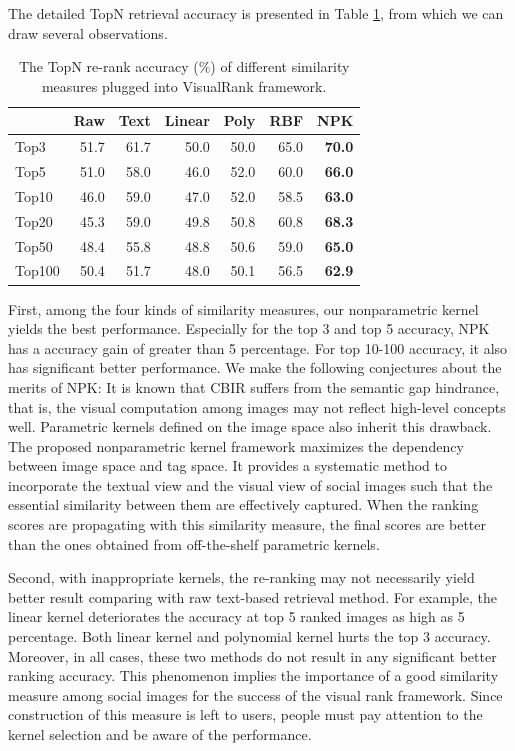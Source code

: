 The detailed TopN retrieval accuracy is presented in Table \ref{table:rerank-result}, from which we can draw several observations.

\begin{table}[!ht]\label{table:rerank-result}
\centering \caption{The TopN re-rank accuracy ($\%$) of different
similarity measures plugged into VisualRank framework. }
\begin{center}
\begin{tabular}{|l|rrrrrr|}
\hline
&Raw &Text &Linear &Poly &RBF &NPK    \\
\hline
\hline
Top3      &51.7 &61.7    &50.0   &50.0   &65.0   &{\bf 70.0} \\
Top5      &51.0 &58.0     &46.0   &52.0   &60.0   &{\bf 66.0}   \\
Top10    &46.0  &59.0     &47.0   &52.0   &58.5   &{\bf 63.0}     \\
Top20    &45.3  &59.0     &49.8   &50.8   &60.8   &{\bf 68.3}       \\
Top50    &48.4  &55.8     &48.8   &50.6   &59.0   &{\bf 65.0}         \\
Top100  &50.4   &51.7     &48.0   &50.1   &56.5   &{\bf 62.9}           \\
\hline
\end{tabular}
\end{center}
\end{table}

First, among the four kinds of similarity measures, our nonparametric
kernel yields the best performance. Especially for the top 3 and top 5
accuracy, NPK has a accuracy gain of greater than 5 percentage. For top
10-100 accuracy, it also has significant better performance. We make the
following conjectures about the merits of NPK: It is known that CBIR
suffers from the semantic gap hindrance, that is, the visual computation
among images may not reflect high-level concepts well. Parametric kernels
defined on the image space also inherit this drawback. The proposed
nonparametric kernel framework maximizes the dependency between
image space and tag space. It provides a systematic method to incorporate
the textual view and the visual view of social images such that the
essential similarity between them are effectively captured. When the
ranking scores are propagating with this similarity measure, the final scores
are better than the ones obtained from off-the-shelf parametric kernels.

Second, with inappropriate kernels, the re-ranking may not necessarily
yield better result comparing with raw text-based retrieval method. For
example, the linear kernel deteriorates the accuracy at top 5 ranked
images as high as 5 percentage. Both linear kernel and polynomial kernel
hurts the top 3 accuracy. Moreover, in all cases, these two methods do not
result in any significant better ranking accuracy. This phenomenon implies
the importance of a good similarity measure among social images for the
success of the visual rank framework. Since construction of this measure is
left to users, people must pay attention to the kernel selection and be
aware of the performance.

